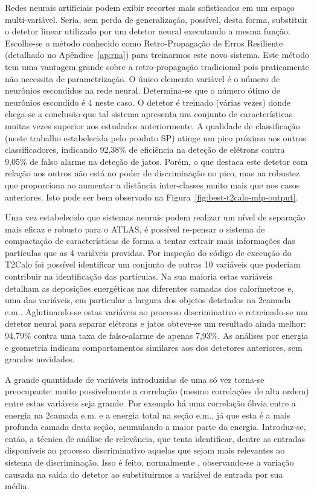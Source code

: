 Redes neurais artificiais podem exibir recortes mais sofisticados em um espaço
multi-variável. Seria, sem perda de generalização, possível, desta forma,
substituir o detetor linear utilizado por um detetor neural executando a mesma
função. Escolhe-se o método conhecido como Retro-Propagação de Erros
Resiliente \cite{rprop} (detalhado no Apêndice~\ref{ap:rna}) para treinarmos
este novo sistema. Este método tem uma vantagem grande sobre a
retro-propagação tradicional pois praticamente não necessita de
parametrização. O único elemento variável é o número de neurônios escondidos
na rede neural. Determina-se que o número ótimo de neurônios escondido é 4
neste caso. O detetor é treinado (várias vezes) donde chega-se a conclusão que
tal sistema apresenta um conjunto de características muitas vezes superior aos
estudados anteriormente. A qualidade de classificação (neste trabalho
estabelecida pelo produto SP) atinge um pico próximo aos outros
classificadores, indicando 92,38\% de eficiência na deteção de elétrons contra
9,05\% de falso alarme na deteção de jatos. Porém, o que destaca este detetor
com relação aos outros não está no poder de discriminação no pico, mas na
robustez que proporciona ao aumentar a distância inter-classes muito mais que
nos casos anteriores. Isto pode ser bem observado na
Figura~\ref{fig:best-t2calo-mlp-output}. 

Uma vez estabelecido que sistemas neurais podem realizar um nível de separação
mais eficaz e robusto para o ATLAS, é possível re-pensar o sistema de
compactação de características de forma a tentar extrair mais informações das
partículas que as 4 variáveis providas. Por inspeção do código de execução do
T2Calo foi possível identificar um conjunto de outras 10 variáveis que
poderiam contribuir na identificação das partículas. Na sua maioria estas
variáveis detalham as deposições energéticas nas diferentes camadas dos
calorímetros e, uma das variáveis, em particular a largura dos objetos
detetados na 2\eira camada e.m.. Aglutinando-se estas variáveis ao processo
discriminativo e retreinado-se um detetor neural para separar elétrons e jatos
obteve-se um resultado ainda melhor: 94,79\% contra uma taxa de falso-alarme
de apenas 7,93\%. As análises por energia e geometria indicam comportamentos
similares aos dos detetores anteriores, sem grandes novidades.

A grande quantidade de variáveis introduzidas de uma só vez torna-se
preocupante: muito possivelmente a correlação (mesmo correlações de alta
ordem) entre estas variáveis seja grande. Por exemplo há uma correlação óbvia
entre a energia na 2\eira camada e.m. e a energia total na seção e.m., já que
esta é a mais profunda camada desta seção, acumulando a maior parte da
energia. Introduz-se, então, a técnica de análise de relevância, que tenta
identificar, dentre as entradas disponíveis ao processo discriminativo aquelas
que sejam mais relevantes ao sistema de discriminação. Isso é feito,
normalmente \cite{relevance}, observando-se a variação causada na saída do
detetor ao substituirmos a variável de entrada por sua média.

